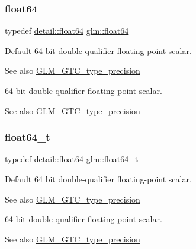 \subsubsection{\texorpdfstring{float64}{float64}}
{\footnotesize\ttfamily typedef \hyperlink{namespaceglm_1_1detail_a5a0a9a1be3fd5dbe6d47ae45c3022b06}{detail\+::float64} \hyperlink{group__gtc__type__precision_gab721f828b41f46b20cf4883b50733d3b}{glm\+::float64}}

Default 64 bit double-\/qualifier floating-\/point scalar. \begin{DoxySeeAlso}{See also}
\hyperlink{group__gtc__type__precision}{G\+L\+M\+\_\+\+G\+T\+C\+\_\+type\+\_\+precision}
\end{DoxySeeAlso}
64 bit double-\/qualifier floating-\/point scalar. \begin{DoxySeeAlso}{See also}
\hyperlink{group__gtc__type__precision}{G\+L\+M\+\_\+\+G\+T\+C\+\_\+type\+\_\+precision} 
\end{DoxySeeAlso}
\mbox{\label{group__gtc__type__precision_gade966a3eb25ebeb16dd53c40d3fdeb46}} 
\subsubsection{\texorpdfstring{float64\+\_\+t}{float64\_t}}
{\footnotesize\ttfamily typedef \hyperlink{namespaceglm_1_1detail_a5a0a9a1be3fd5dbe6d47ae45c3022b06}{detail\+::float64} \hyperlink{group__gtc__type__precision_gade966a3eb25ebeb16dd53c40d3fdeb46}{glm\+::float64\+\_\+t}}

Default 64 bit double-\/qualifier floating-\/point scalar. \begin{DoxySeeAlso}{See also}
\hyperlink{group__gtc__type__precision}{G\+L\+M\+\_\+\+G\+T\+C\+\_\+type\+\_\+precision}
\end{DoxySeeAlso}
64 bit double-\/qualifier floating-\/point scalar. \begin{DoxySeeAlso}{See also}
\hyperlink{group__gtc__type__precision}{G\+L\+M\+\_\+\+G\+T\+C\+\_\+type\+\_\+precision} 
\end{DoxySeeAlso}
\mbox{\label{group__gtc__type__precision_ga687a2fb53c536086879726d0c0f88a8b}} 
